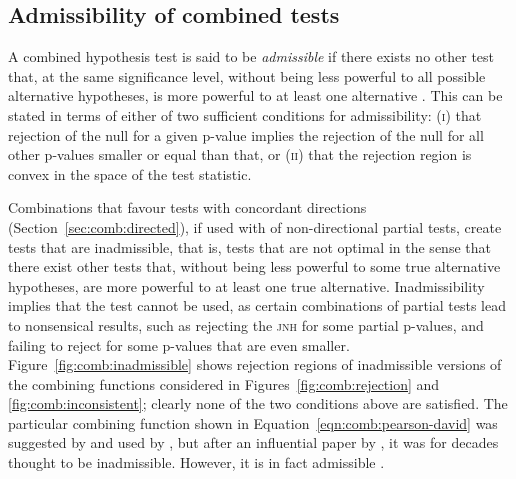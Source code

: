 \subsection{Admissibility of combined tests}
\label{sec:comb:admissibility}

A combined hypothesis test is said to be \emph{admissible} if there exists no other test that, at the same significance level, without being less powerful to all possible alternative hypotheses, is more powerful to at least one alternative \citep{Lehmann2005}. This can be stated in terms of either of two sufficient conditions for admissibility: (\textsc{i}) that rejection of the null for a given p-value implies the rejection of the null for all other p-values smaller or equal than that, or (\textsc{ii}) that the rejection region is convex in the space of the test statistic.

Combinations that favour tests with concordant directions (Section~\ref{sec:comb:directed}), if used with of non-directional partial tests, create tests that are inadmissible, that is, tests that are not optimal in the sense that there exist other tests that, without being less powerful to some true alternative hypotheses, are more powerful to at least one true alternative. Inadmissibility implies that the test cannot be used, as certain combinations of partial tests lead to nonsensical results, such as rejecting the \textsc{jnh} for some partial p-values, and failing to reject for some p-values that are even smaller. Figure~\ref{fig:comb:inadmissible} shows rejection regions of inadmissible versions of the combining functions considered in Figures~\ref{fig:comb:rejection} and \ref{fig:comb:inconsistent}; clearly none of the two conditions above are satisfied. The particular combining function shown in Equation~\ref{eqn:comb:pearson-david} was suggested by \citet{Pearson1933} and used by \citet{David1934}, but after an influential paper by \citet{Birnbaum1954}, it was for decades thought to be inadmissible. However, it is in fact admissible \citep{Owen2009}.

